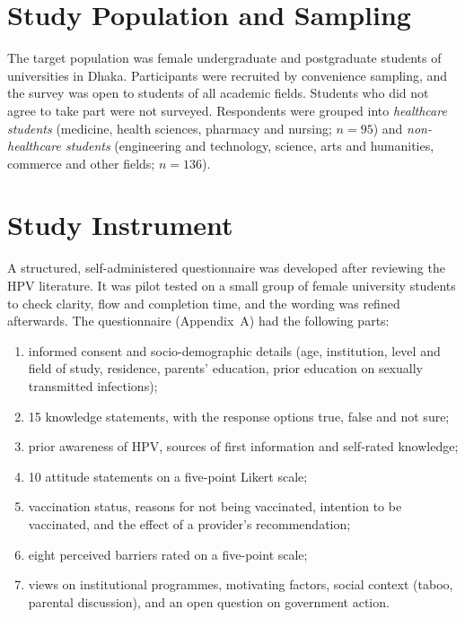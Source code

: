 \section{Study Population and Sampling}
The target population was female undergraduate and postgraduate students of universities in Dhaka. Participants were recruited by convenience sampling, and the survey was open to students of all academic fields.  Students who did not agree to take part were not surveyed. Respondents were grouped into \emph{healthcare students} (medicine, health sciences, pharmacy and nursing; $n=95$) and \emph{non-healthcare students} (engineering and technology, science, arts and humanities, commerce and other fields; $n=136$).

\section{Study Instrument}
A structured, self-administered questionnaire was developed after reviewing the HPV literature. It was pilot tested on a small group of female university students to check clarity, flow and completion time, and the wording was refined afterwards.  The questionnaire (Appendix~A) had the following parts:
\begin{enumerate}[itemsep=0pt]
\item informed consent and socio-demographic details (age, institution, level and field of study, residence, parents' education, prior education on sexually transmitted infections);
\item 15 knowledge statements, with the response options true, false and not sure;
\item prior awareness of HPV, sources of first information and self-rated knowledge;
\item 10 attitude statements on a five-point Likert scale;
\item vaccination status, reasons for not being vaccinated, intention to be vaccinated, and the effect of a provider's recommendation;
\item eight perceived barriers rated on a five-point scale;
\item views on institutional programmes, motivating factors, social context (taboo, parental discussion), and an open question on government action.
\end{enumerate}

